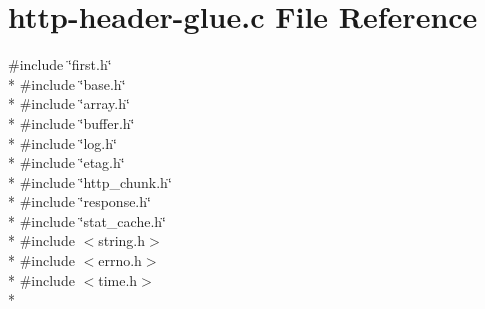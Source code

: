 \hypertarget{http-header-glue_8c}{\section{http-\/header-\/glue.c File Reference}
\label{http-header-glue_8c}
}
{\ttfamily \#include \char`\"{}first.\-h\char`\"{}}\\*
{\ttfamily \#include \char`\"{}base.\-h\char`\"{}}\\*
{\ttfamily \#include \char`\"{}array.\-h\char`\"{}}\\*
{\ttfamily \#include \char`\"{}buffer.\-h\char`\"{}}\\*
{\ttfamily \#include \char`\"{}log.\-h\char`\"{}}\\*
{\ttfamily \#include \char`\"{}etag.\-h\char`\"{}}\\*
{\ttfamily \#include \char`\"{}http\-\_\-chunk.\-h\char`\"{}}\\*
{\ttfamily \#include \char`\"{}response.\-h\char`\"{}}\\*
{\ttfamily \#include \char`\"{}stat\-\_\-cache.\-h\char`\"{}}\\*
{\ttfamily \#include $<$string.\-h$>$}\\*
{\ttfamily \#include $<$errno.\-h$>$}\\*
{\ttfamily \#include $<$time.\-h$>$}\\*
